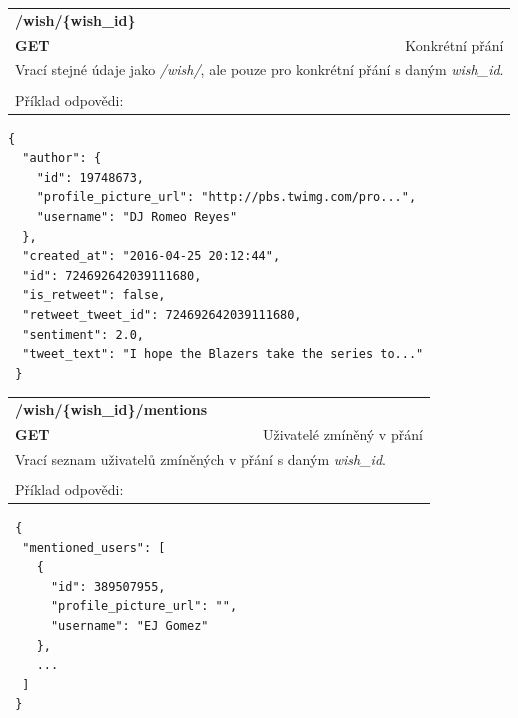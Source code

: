 \documentclass[thesis=B,czech]{FITthesis}[2012/06/26]
\begin{document}
\begin{table}[h]
\begin{tabular}{llllr}
\rowcolor[HTML]{EFEFEF}
\large \textbf{/wish/\{wish\_id\}}        &         &                 &        & \multicolumn{1}{l}{}                \\
\rowcolor[HTML]{EFEFEF}
\textbf{GET}          &         &                 &        & Konkrétní přání                        \\
\multicolumn{5}{l}{\parbox[t]{12.8cm}{Vrací stejné údaje jako \textit{/wish/}, ale pouze pro konkrétní přání s daným \textit{wish\_id}.}  } \\  
 & & & & \\
 Příklad odpovědi:
\end{tabular}
\end{table}
 
\begin{lstlisting}
{
  "author": {
    "id": 19748673,
    "profile_picture_url": "http://pbs.twimg.com/pro...",
    "username": "DJ Romeo Reyes"
  },
  "created_at": "2016-04-25 20:12:44",
  "id": 724692642039111680,
  "is_retweet": false,
  "retweet_tweet_id": 724692642039111680,
  "sentiment": 2.0,
  "tweet_text": "I hope the Blazers take the series to..."
 }
\end{lstlisting} 

\begin{table}[h]
\begin{tabular}{llllr}
\rowcolor[HTML]{EFEFEF}
\large \textbf{/wish/\{wish\_id\}/mentions}        &         &                 &        & \multicolumn{1}{l}{}                \\
\rowcolor[HTML]{EFEFEF}
\textbf{GET}          &         &                 &        & Uživatelé zmíněný v přání                        \\
\multicolumn{5}{l}{\parbox[t]{12.8cm}{Vrací seznam uživatelů zmíněných v přání s daným \textit{wish\_id}.}  } \\    
 & & & & \\
 Příklad odpovědi:
\end{tabular}
\end{table}

\begin{lstlisting}
 {
  "mentioned_users": [
    {
      "id": 389507955,
      "profile_picture_url": "",
      "username": "EJ Gomez"
    },
    ...
  ]
 }
\end{lstlisting} 
\end{document}
